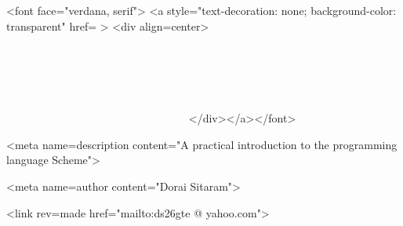 \ifx\shipout\UnDeFiNeD
\htmlonly
{}
\rawhtml
<font face="verdana, serif">
<a style="text-decoration: none; background-color: transparent"
href=\endrawhtml 
{}
\rawhtml>
<div align=center>
\endrawhtml
{\bf\obeylines
~~~~~~~~~
~~~~~~~~~
~~~~~~~~~
~~~~~~~~~
~~~~~~~~~
~~~~~~~~~~~~
~~~~~~~~~~~~~~~~~~~~~~~~~~~
~~~
~~~
~~~~~~~~~~~~~~~~~~~
~~~~~~~~~~~~~~~~~~~~~~
~~~~~~~~~
~~~~~~~~~
~~~~~~~~~
~~~~~~~~~
~~~~~~~~~~~~
~~~~~~~~~~~~~~~~~~~~~~~~~~~~~~~~~~~~~~~~~
~~~~~~~~~
~~~~~~~~~
~~~~~~~~~
~~~~~~~~~
~~~~~~~~~
~~~~~~~~~
~~~~~~~~~
~~~~~~~~~
~~~~~~~~~
~~~~~~~~~
~~~~~~~~~
}
\rawhtml
</div></a></font>
\endrawhtml
\endhtmlonly

\htmlheadonly
<meta name=description content="A practical
introduction to the programming language Scheme">

<meta name=author content="Dorai Sitaram">

<link rev=made href="mailto:ds26gte @ yahoo.com">
\endhtmlheadonly
\fi
\eject
